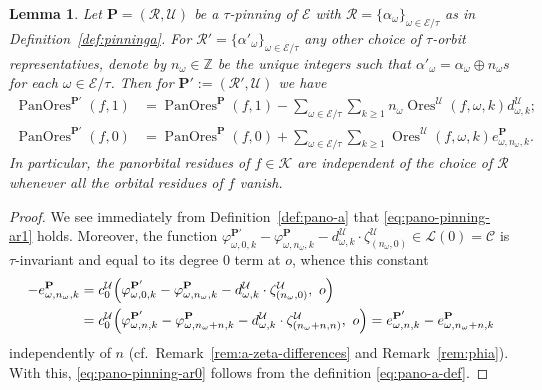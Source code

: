 \documentclass[preprint,12pt]{elsarticle}
\numberwithin{equation}{section} %
\theoremstyle{theorem}
\newtheorem{lemma}[theorem]{Lemma}
\theoremstyle{definition}
\newcommand{\Ca}{\mathcal{C}} %
\newcommand{\bk}{\mathcal{K}} %
\newcommand{\ec}{\mathcal{E}} %
\newcommand{\idec}{{o}} %
\newcommand{\orbita}{{\ec/\tau}} %
\newcommand{\Z}{\mathbb{Z}} %
\newcommand{\za}[2]{\zeta^{\mathcal{U}}_{( {#1} , {#2} )}}
\DeclareMathOperator{\ores}{Ores}
\DeclareMathOperator{\pano}{PanOres}
\begin{document}
\begin{lemma}\label{lem:pano-pinning-ar} Let $\mathbf{P}=(\mathcal{R},\mathcal{U})$ be a $\tau$-pinning of $\ec$ with $\mathcal{R}=\{\alpha_\omega\}_{\omega\in\orbita}$ as in Definition~\ref{def:pinninga}. For $\mathcal{R}'=\{\alpha'_\omega\}_{\omega\in\orbita}$ any other choice of $\tau$-orbit representatives, denote by $n_\omega\in\Z$ be the unique integers such that $\alpha'_\omega=\alpha_\omega\oplus n_\omega s$ for each $\omega\in\orbita$. Then for $\mathbf{P}':=(\mathcal{R}',\mathcal{U})$ we have
\begin{align}\label{eq:pano-pinning-ar1} 
    \pano^{\mathbf{P}'}(f,1)&=\pano^\mathbf{P}(f,1)-\!\!\sum_{\omega\in\orbita}\sum_{k\geq 1}n_\omega \ores^\mathcal{U}(f,\omega,k) d_{\omega,k}^{\mathcal{U}};\\
    \pano^{\mathbf{P}'}(f,0)&=\pano^\mathbf{P}(f,0)+\!\!\sum_{\omega\in\orbita} \sum_{k\geq 1}\ores^\mathcal{U}(f,\omega,k) e^\mathbf{P}_{\omega,n_\omega,k}.\label{eq:pano-pinning-ar0}
\end{align}
In particular, the panorbital residues of $f\in\bk$ are independent of the choice of $\mathcal{R}$ whenever all the orbital residues of $f$ vanish.
\end{lemma}

\begin{proof}
We see immediately from Definition~\ref{def:pano-a} that \eqref{eq:pano-pinning-ar1} holds.
Moreover, the function $\varphi^{\mathbf{P}'}_{\omega,0,k}-\varphi^\mathbf{P}_{\omega,n_\omega,k}-d_{\omega,k}^\mathcal{U}\cdot\za{n_\omega}{0}\in\mathcal{L}(0)=\Ca$ is $\tau$-invariant and equal to its degree $0$ term at $\idec$, whence this constant
\begin{align*}
    -e^\mathbf{P}_{\omega,n_\omega,k}&=c_0^{\mathcal{U}}\Bigl(\varphi^{\mathbf{P}'}_{\omega,0,k}-\varphi^\mathbf{P}_{\omega,n_\omega,k}-d^\mathcal{U}_{\omega,k}\cdot\za{n_\omega}{0},\ \idec\Bigr) \\&=c_0^{\mathcal{U}}\Bigl(\varphi^{\mathbf{P}'}_{\omega,n,k}-\varphi^\mathbf{P}_{\omega,n_\omega+n,k}-d^\mathcal{U}_{\omega,k}\cdot\za{n_\omega+n}{n}, \ \idec\Bigr)=e^{\mathbf{P}'}_{\omega,n,k}-e^\mathbf{P}_{\omega,n_\omega+n,k}\end{align*} independently of $n$ (cf.~Remark~\ref{rem:a-zeta-differences} and Remark~\ref{rem:phia}). With this, \eqref{eq:pano-pinning-ar0} follows from the definition \eqref{eq:pano-a-def}.\end{proof}
\end{document}
